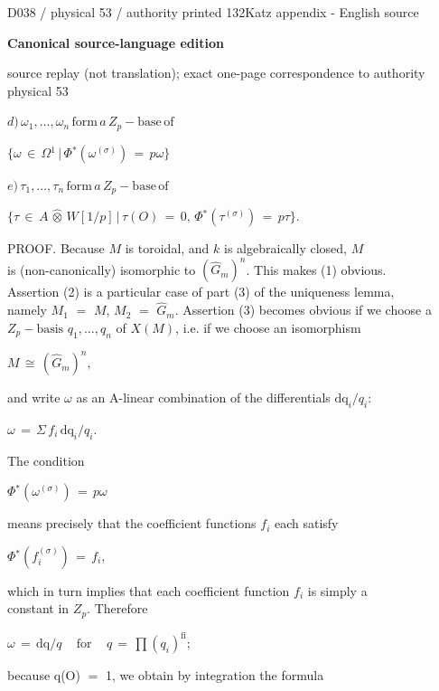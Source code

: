 \documentclass[9pt]{article}
\newcommand{\CanonText}[1]{\par{\fontsize{8.0}{9.35}\selectfont\RaggedRight #1\par}\vspace{2.2pt}}
\newcommand{\CanonDisplay}[1]{\par\vspace{1.2pt}\begin{center}{\fontsize{7.2}{8.4}\selectfont\(\displaystyle #1\)}\end{center}\vspace{1.2pt}}
\newcommand{\LayerTitle}{Canonical source-language edition}
\begin{document}
\noindent\begin{minipage}[t][\dimexpr\textheight-5pt\relax][t]{\textwidth}
{\sffamily\fontsize{7.3}{8.2}\selectfont\color{Quiet} D038 / physical 53 / authority printed 132\hfill Katz appendix - English source}
\par{}\vspace{4.5pt}
{\sffamily\fontsize{10.4}{11.6}\selectfont\bfseries\color{Accent} \LayerTitle}
\par{\sffamily\fontsize{6.7}{7.7}\selectfont\color{Quiet} source replay (not translation); exact one-page correspondence to authority physical 53}
\vspace{5pt}
\CanonDisplay{d)\,\omega{}_{1},\ldots{},\omega{}_{n}\,\text{form}\,a\,Z_{p}-\text{base}\,\text{of}}
\CanonDisplay{\lbrace{}\omega{}\,\in{}\,\Omega{}^{1}\,|\,\Phi{}^{*}(\omega{}^{(\sigma{})})\,=\,p\omega{}\rbrace{}}
\CanonDisplay{e)\,\tau{}_{1},\ldots{},\tau{}_{n}\,\text{form}\,a\,Z_{p}-\text{base}\,\text{of}}
\CanonDisplay{\lbrace{}\tau{}\,\in{}\,A\,\widehat{\otimes}\,W[1/p]\,|\,\tau{}(O)\,=\,0,\,\Phi{}^{*}(\tau{}^{(\sigma{})})\,=\,p\tau{}\rbrace{}.}
\CanonText{PROOF. Because \(M\) is toroidal, and \(k\) is algebraically closed, \(M\)\\is (non-canonically) isomorphic to \((\widehat{G}_{m})^{n}\). This makes (1) obvious.\\Assertion (2) is a particular case of part (3) of the uniqueness lemma,\\namely \(M_{1}\) \(=\) \(M\), \(M_{2}\) \(=\) \(\widehat{G}_{m}\). Assertion (3) becomes obvious if we choose a\\\(Z_{p}-\text{basis}\) \(q_{1},\ldots{},q_{n}\) of \(X(M)\), i.e. if we choose an isomorphism}
\CanonDisplay{M\,\cong{}\,(\widehat{G}_{m})^{n},}
\CanonText{and write \(\omega{}\) as an A-linear combination of the differentials \(\text{dq}_{i}/q_{i}\):}
\CanonDisplay{\omega{}\,=\,\Sigma{}\,f_{i}\,\text{dq}_{i}/q_{i}.}
\CanonText{The condition}
\CanonDisplay{\Phi{}^{*}(\omega{}^{(\sigma{})})\,=\,p\omega{}}
\CanonText{means precisely that the coefficient functions \(f_{i}\) each satisfy}
\CanonDisplay{\Phi{}^{*}(f_{i}^{(\sigma{})})\,=\,f_{i},}
\CanonText{which in turn implies that each coefficient function \(f_{i}\) is simply a\\constant in \(Z_{p}\). Therefore}
\CanonDisplay{\omega{}\,=\,\text{dq}/q\quad\,\text{for}\quad\,q\,=\,\prod{}(q_{i})^{\mathrm{fi}};}
\CanonText{because q(O) \(=\) 1, we obtain by integration the formula}

\end{minipage}
\end{document}
